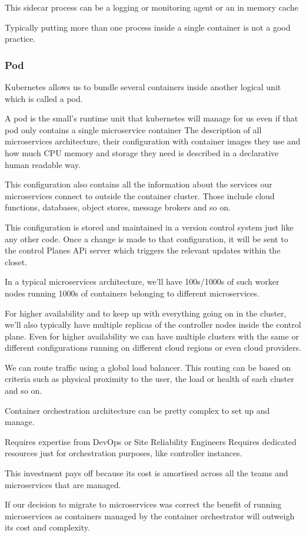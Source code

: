 This sidecar process can be a logging or monitoring agent or an in memory cache

Typically putting more than one process inside a single container is not a good practice.

\subsubsection{Pod}
Kubernetes allows us to bundle several containers inside another logical unit which is called a pod.

A pod is the small's runtime unit that kubernetes will manage for us even if that pod only contains a single microservice container
The description of all microservices architecture, their configuration with container images they use and how much CPU memory and storage they need is described in a declarative human readable way.

This configuration also contains all the information about the services our microservices connect to outside the container cluster.
Those include cloud functions, databases, object stores, message brokers and so on.

This configuration is stored and maintained in a version control system just like any other code.
Once a change is made to that configuration, it will be sent to the control Planes APi server which triggers the relevant updates within the closet.

In a typical microservices architecture, we'll have 100s/1000s of such worker nodes running 1000s of containers belonging to different microservices.

For higher availability and to keep up with everything going on in the cluster, we'll also typically have multiple replicas of the controller nodes inside the control plane.
Even for higher availability we can have multiple clusters with the same or different configurations running on different cloud regions or even cloud providers.

We can route traffic using a global load balancer.
This routing can be based on criteria such as physical proximity to the user, the load or health of each cluster and so on.

Container orchestration architecture can be pretty complex to set up and manage.

Requires expertise from DevOps or Site Reliability Engineers
Requires dedicated resources just for orchestration purposes, like controller instances.

This investment pays off because its cost is amortised across all the teams and microservices that are managed.

\begin{note}
    If our decision to migrate to microservices was correct the benefit of running microservices as containers managed by the container orchestrator will outweigh its cost and complexity.
\end{note}
